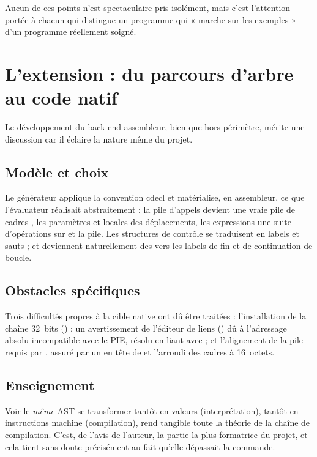 Aucun de ces points n'est spectaculaire pris isolément, mais c'est l'attention
portée à chacun qui distingue un programme qui « marche sur les exemples » d'un
programme réellement soigné.

\section{L'extension : du parcours d'arbre au code natif}

Le développement du back-end assembleur, bien que hors périmètre, mérite une
discussion car il éclaire la nature même du projet.

\subsection{Modèle et choix}

Le générateur applique la convention cdecl et matérialise, en assembleur, ce que
l'évaluateur réalisait abstraitement : la pile d'appels devient une vraie pile de
cadres , les paramètres et locales des déplacements, les expressions
une suite d'opérations sur  et la pile. Les structures de contrôle se
traduisent en labels et sauts ;  et  deviennent
naturellement des  vers les labels de fin et de continuation de boucle.

\subsection{Obstacles spécifiques}

Trois difficultés propres à la cible native ont dû être traitées : l'installation
de la chaîne 32~bits () ; un avertissement de l'éditeur de
liens () dû à l'adressage absolu incompatible avec le PIE,
résolu en liant avec  ; et l'alignement de la pile requis par
, assuré par un  en tête de  et
l'arrondi des cadres à 16~octets.

\subsection{Enseignement}

Voir le \emph{même} AST se transformer tantôt en valeurs (interprétation), tantôt
en instructions machine (compilation), rend tangible toute la théorie de la
chaîne de compilation. C'est, de l'avis de l'auteur, la partie la plus formatrice
du projet, et cela tient sans doute précisément au fait qu'elle dépassait la
commande.

